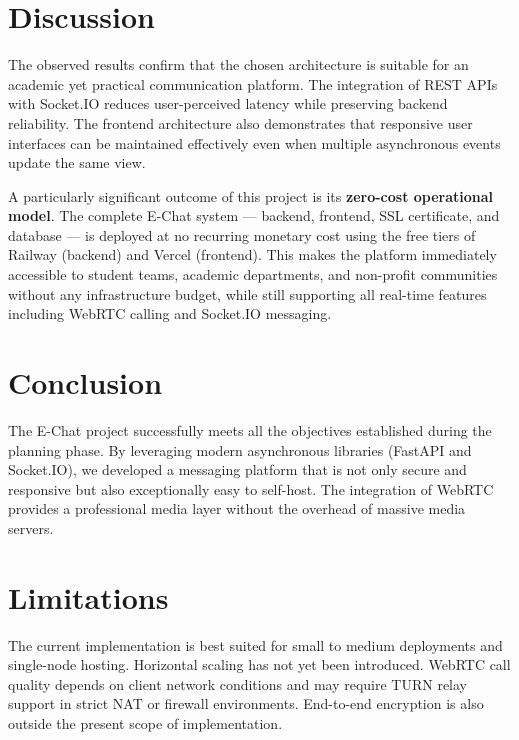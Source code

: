 \documentclass[12pt,a4paper,oneside]{report}
\begin{document}
\section{Discussion}
\label{sec:discussion}
The observed results confirm that the chosen architecture is suitable for an
academic yet practical communication platform. The integration of REST APIs with
Socket.IO reduces user-perceived latency while preserving backend reliability.
The frontend architecture also demonstrates that responsive user interfaces can be
maintained effectively even when multiple asynchronous events update the same view.

A particularly significant outcome of this project is its \textbf{zero-cost
operational model}. The complete E-Chat system --- backend, frontend, SSL
certificate, and database --- is deployed at no recurring monetary cost using
the free tiers of Railway (backend) and Vercel (frontend). This makes the
platform immediately accessible to student teams, academic departments, and
non-profit communities without any infrastructure budget, while still supporting
all real-time features including WebRTC calling and Socket.IO messaging.

\section{Conclusion}
\label{sec:conclusion}

The E-Chat project successfully meets all the objectives established during the
planning phase. By leveraging modern asynchronous libraries (FastAPI and Socket.IO),
we developed a messaging platform that is not only secure and responsive but also
exceptionally easy to self-host. The integration of WebRTC provides a professional
media layer without the overhead of massive media servers.

\section{Limitations}
\label{sec:limitations}

The current implementation is best suited for small to medium deployments and
single-node hosting. Horizontal scaling has not yet been introduced. WebRTC call
quality depends on client network conditions and may require TURN relay support in
strict NAT or firewall environments. End-to-end encryption is also outside the
present scope of implementation.

\cleardoublepage

\end{document}
